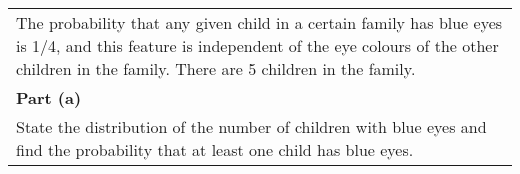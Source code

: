 \documentclass[a4paper,12pt]{article}
\begin{document}
\begin{table}[ht!]
     \centering
     \begin{tabular}{|p{15cm}|}
     \hline        
 The probability that any given child in a certain family has blue eyes is 1/4, and this feature is independent of the eye colours of the other children in the family.  There are 5 children in the family.\\\medskip
\noindent \textbf{Part (a)}\\ 
State the distribution of the number of children with blue eyes and find the probability that at least one child has blue eyes.


\\ \hline
      \end{tabular}
    \end{table}
\end{document}

